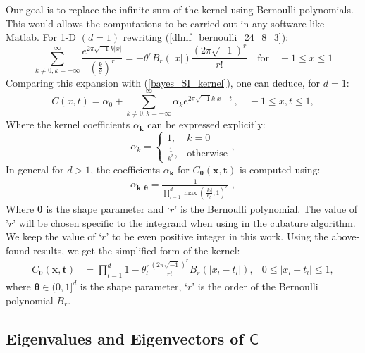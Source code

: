 \documentclass[twocolumn]{svjour3}          %
\newcommand{\bm}[1]{\boldsymbol{#1}}
\newcommand{\vtheta}{{\bm{\theta}}}
\newcommand{\vk}{\bm{k}}
\newcommand{\vt}{\bm{t}}
\newcommand{\vx}{\bm{x}}
\newcommand{\mC}{\mathsf{C}}
\begin{document}
Our goal is to replace the infinite sum of the kernel using Bernoulli polynomials. This would allows the computations to be carried out in any software like Matlab.
For 1-D $(d=1)$ rewriting (\ref{dlmf_bernoulli_24_8_3}):
\[
\sum_{k \neq 0, k=-\infty}^\infty \frac{e^{2\pi\sqrt{-1} k |x|}}{ (\frac{k}{\theta})^{r}}
=
-{\theta^r} B_{r}(|x|) \frac{(2 \pi \sqrt{-1})^{r}}{r!}
\quad \text{for} \quad -1 \leq x \leq 1
\]
Comparing this expansion with (\ref{bayes_SI_kernel}), one can deduce, for $d=1$:
\[
C({x}, {t}) = 
\alpha_0 + \sum_{k \neq 0, k=-\infty}^\infty \alpha_k e^{2\pi\sqrt{-1} k |x-t|}   
, \quad -1 \leq x,t \leq 1,
\]
Where the kernel coefficients ${\alpha}_{\vk}$ can be expressed explicitly:
\[
\alpha_k = 
\begin{cases}
1, & k=0 \\
\frac{1}{k^r}, & \text{otherwise}
\end{cases},
\]
In general for $d>1$, the coefficients $\alpha_{\vk}$ for $C_{\vtheta}(\vx,\vt)$ is computed using:
\begin{align*}
\alpha_{\vk, \vtheta} = \frac{1}{\prod_{l=1}^d \max(\frac{|k_l|}{\theta_l}, 1)^r} \; ,
\end{align*}
Where $\vtheta$ is the shape parameter and `$r$' is the Bernoulli polynomial. The value of '$r$' will be chosen specific to the integrand when using in the cubature algorithm. We keep the value of `$r$' to be even positive integer in this work.
Using the above-found results, we get the simplified form of the kernel:
\begin{align}
\label{the_kernel_eqn_bernoulli}
C_\vtheta(\vx, \vt) &=
 \prod_{l=1}^d
1 - \theta_l^r \frac{(2 \pi \sqrt{-1})^{r}}{r!} B_{r}( |{x_l-t_l}| ),
& 0 \leq |x_l - t_l| \leq 1,
\end{align}
where $\vtheta \in (0,1]^d$ is the {shape parameter}, `$r$' is the order of the Bernoulli polynomial $B_{r}$.



















\subsection{Eigenvalues and Eigenvectors of $\mC$}
\end{document}
